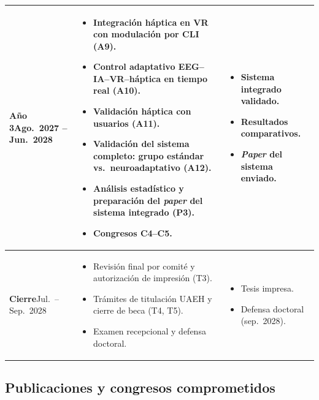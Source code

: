 \documentclass[12pt]{article}
\begin{document}
\begin{tabularx}{\textwidth}{|>{\raggedright\arraybackslash}p{3.0cm}|>{\raggedright\arraybackslash}X|>{\raggedright\arraybackslash}p{3.8cm}|}
\hline
\textbf{Año 3}\newline Ago.\ 2027 --\newline Jun.\ 2028 &
\begin{itemize}
  \item Integración háptica en VR con modulación por CLI (A9).
  \item Control adaptativo EEG--IA--VR--háptica en tiempo real (A10).
  \item Validación háptica con usuarios (A11).
  \item Validación del sistema completo: grupo estándar vs.\ neuroadaptativo (A12).
  \item Análisis estadístico y preparación del \textit{paper} del sistema integrado (P3).
  \item Congresos C4--C5.
\end{itemize}
&
\begin{itemize}
  \item Sistema integrado validado.
  \item Resultados comparativos.
  \item \textit{Paper} del sistema enviado.
\end{itemize} \\

\hline
\textbf{Cierre}\newline Jul.\ --\newline Sep.\ 2028 &
\begin{itemize}
  \item Revisión final por comité y autorización de impresión (T3).
  \item Trámites de titulación UAEH y cierre de beca (T4, T5).
  \item Examen recepcional y defensa doctoral.
\end{itemize}
&
\begin{itemize}
  \item Tesis impresa.
  \item Defensa doctoral (sep.\ 2028).
\end{itemize} \\

\hline
\end{tabularx}
\par\endgroup

\subsection*{Publicaciones y congresos comprometidos}
\end{document}

